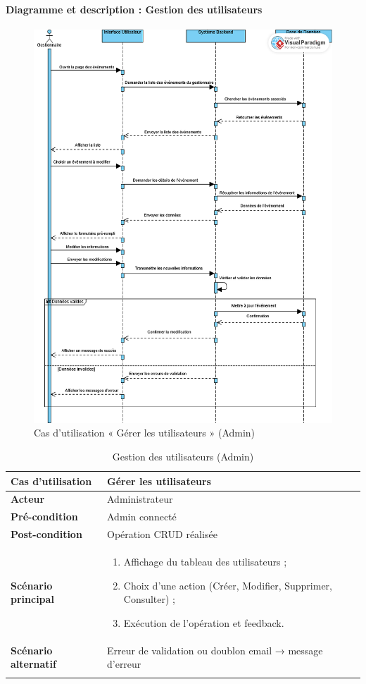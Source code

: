 \paragraph{Diagramme et description : Gestion des utilisateurs}
\begin{figure}[H]
  \centering
  \includegraphics[width=0.6\linewidth]{projet/images/diagramme de sequance/modifier gestionnaire sequance diagram.png}
  \caption{Cas d'utilisation « Gérer les utilisateurs » (Admin)}
  \label{fig:uc-admin}
\end{figure}

\begin{longtable}{|>{\bfseries}p{4cm}|p{10cm}|}
\hline
Cas d'utilisation & Gérer les utilisateurs \\
\hline
Acteur & Administrateur \\
\hline
Pré-condition & Admin connecté \\
\hline
Post-condition & Opération CRUD réalisée \\
\hline
Scénario principal &
\begin{enumerate}
  \item Affichage du tableau des utilisateurs ;
  \item Choix d’une action (Créer, Modifier, Supprimer, Consulter) ;
  \item Exécution de l’opération et feedback.
\end{enumerate} \\
\hline
Scénario alternatif & Erreur de validation ou doublon email → message d’erreur \\
\hline
\caption{Gestion des utilisateurs (Admin)}
\end{longtable}

